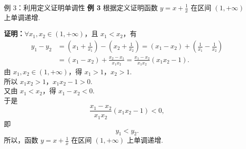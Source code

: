\documentclass[aspectratio=169, 10pt]{beamer}
\begin{document}
	\begin{frame}{例 3：利用定义证明单调性}
		\textbf{\textcolor{myblue}{例 3}} 根据定义证明函数 \(y=x+\frac{1}{x}\) 在区间 \((1, +\infty)\) 上单调递增.
		
		\vspace{0.2cm}
		\textbf{\textcolor{myblue}{证明：}}\(\forall x_1, x_2 \in (1, +\infty)\)，且 \(x_1 < x_2\)，有
		\begin{align*}
			y_1 - y_2 &= \left(x_1 + \frac{1}{x_1}\right) - \left(x_2 + \frac{1}{x_2}\right) = (x_1 - x_2) + \left(\frac{1}{x_1} - \frac{1}{x_2}\right) \\
			&= (x_1 - x_2) + \frac{x_2 - x_1}{x_1x_2} = \frac{x_1 - x_2}{x_1x_2}(x_1x_2 - 1).
		\end{align*}
		由 \(x_1, x_2 \in (1, +\infty)\)，得 \(x_1 > 1\)，\(x_2 > 1\).\\
		所以 \(x_1x_2 > 1\)，\(x_1x_2 - 1 > 0\).\\
		又由 \(x_1 < x_2\)，得 \(x_1 - x_2 < 0\).\\
		于是
		\[
		\frac{x_1 - x_2}{x_1x_2}(x_1x_2 - 1) < 0,
		\]
		即
		\[
		y_1 < y_2.
		\]
		所以，函数 \(y=x+\frac{1}{x}\) 在区间 \((1, +\infty)\) 上单调递增.
	\end{frame}
	
\end{document}
